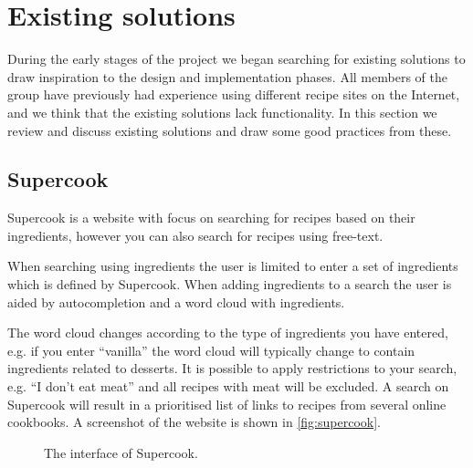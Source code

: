 \section{Existing solutions}\label{sec:exist}

During the early stages of the project we began searching for existing solutions to draw inspiration to the design and implementation phases. All members of the group have previously had experience using different recipe sites on the Internet, and we think that the existing solutions lack functionality. In this section we review and discuss existing solutions and draw some good practices from these.

\subsection{Supercook}
Supercook\cite{supercook} is a website with focus on searching for recipes based on their ingredients, however you can also search for recipes using free-text. 

When searching using ingredients the user is limited to enter a set of ingredients which is defined by Supercook. When adding ingredients to a search the user is aided by autocompletion and a word cloud with ingredients.

The word cloud changes according to the type of ingredients you have entered, e.g. if you enter ``vanilla'' the word cloud will typically change to contain ingredients related to desserts. It is possible to apply restrictions to your search, e.g. ``I don't eat meat'' and all recipes with meat will be excluded. A search on Supercook will result in a prioritised list of links to recipes from several online cookbooks. A screenshot of the website is shown in \autoref{fig:supercook}.

\begin{figure}[H]
\centering
{}
\caption{The interface of Supercook.}
\label{fig:supercook}
\end{figure}


